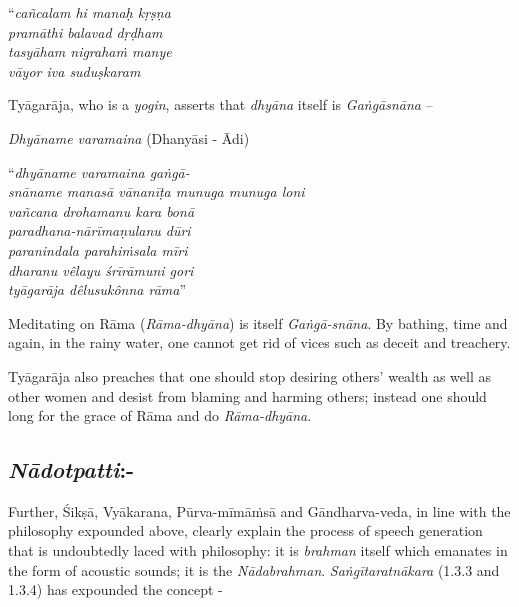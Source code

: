 \begin{centerquote}
“\textit{cañcalam hi manaḥ kṛṣṇa}\\ \textit{pramāthi balavad dṛḍham }\\ \textit{tasyāham nigrahaṁ manye}\\ \textit{vāyor iva suduṣkaram} 
\end{centerquote}

Tyāgarāja, who is a \textit{yogin}, asserts that \textit{dhyāna} itself is \textit{Gaṅgāsnāna} –

\textit{Dhyāname varamaina} (Dhanyāsi - Ādi)

\begin{centerquote}
“\textit{dhyāname varamaina gaṅgā-}\\ \textit{snāname manasā vānanīṭa munuga munuga loni} \\ \textit{vañcana drohamanu kara bonā}\\ \textit{paradhana-nārīmaṇulanu dūri}\\ \textit{paranindala parahiṁsala mīri}\\ \textit{dharanu vêlayu śrīrāmuni gori}\\ \textit{tyāgarāja dêlusukônna rāma}”
\end{centerquote}

Meditating on Rāma (\textit{Rāma-dhyāna}) is itself \textit{Gaṅgā-snāna}. By bathing, time and again, in the rainy water, one cannot get rid of vices such as deceit and treachery. 

Tyāgarāja also preaches that one should stop desiring others’ wealth as well as other women and desist from blaming and harming others; instead one should long for the grace of Rāma and do \textit{Rāma-dhyāna}.

\vspace{-.3cm}

\subsection*{\textit{Nādotpatti}:-}

Further, Śikṣā, Vyākarana, Pūrva-mīmāṁsā and Gāndharva-veda,\textit{} in line with the philosophy expounded above, clearly explain the process of speech generation that is undoubtedly laced with philosophy: it is \textit{brahman} itself which emanates in the form of acoustic sounds; it is the \textit{Nādabrahman}. \textit{Saṅgītaratnākara} (1.3.3 and 1.3.4) has expounded the concept -

